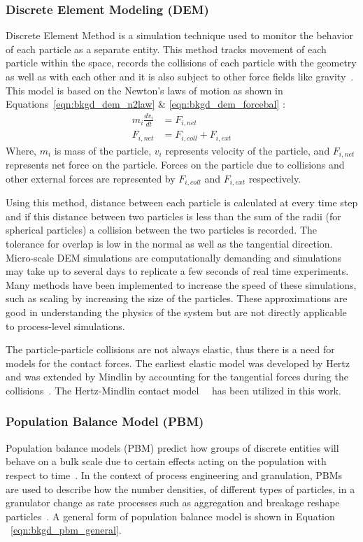 \documentclass[preprint,11pt,authoryear]{elsarticle}
\begin{document}
\subsubsection{Discrete Element Modeling (DEM)}
Discrete Element Method is a simulation technique used to monitor the
behavior of each particle as a separate entity. This method tracks 
movement of each particle within the space, records the collisions 
of each particle with the geometry as well as with each other and it 
is also subject to other force fields like  gravity~\citep{Barrasso2015cerd}. 
This model is based on the Newton's laws of motion as shown in Equations~\ref{eqn:bkgd_dem_n2law} \&
\ref{eqn:bkgd_dem_forcebal} : \\
\begin{align}
m_i\frac{dv_i}{dt} &= F_{i,net} \label{eqn:bkgd_dem_n2law} \\
F_{i,net} &=  F_{i,coll} +  F_{i,ext} \label{eqn:bkgd_dem_forcebal}
\end{align}
Where, $m_i$ is mass of the particle, $v_i$ represents velocity of the
particle, and $F_{i,net}$ represents net force on the particle. Forces on the
particle due to collisions and other external forces are represented by
$F_{i,coll}$ and $F_{i,ext}$ respectively.

Using this method, distance between each particle is calculated at every
time step and if this distance between two particles is less than the sum of
the radii (for spherical particles)  a collision between the two particles is
recorded. The tolerance for overlap is low in the normal as well as the
tangential direction. Micro-scale DEM simulations are computationally
demanding and simulations may take up to several days to replicate a few
seconds of real time experiments. Many methods have been implemented to
increase the speed of these simulations, such as scaling by increasing the
size of the particles. These approximations are good in understanding the
physics of the system but are not directly applicable to process-level
simulations.

The particle-particle collisions are not always elastic, thus there is a need
for models for the contact forces. The earliest elastic model was developed by
Hertz and was extended by Mindlin by accounting for the  tangential forces
during the collisions~\citep{adams2000}. The Hertz-Mindlin contact
model~\citep{gantt2006}~\citep{hassanpour2013} has been utilized in this work.
 

\subsubsection{Population Balance Model (PBM)}
Population balance models (PBM) predict how groups of discrete entities will 
behave on a bulk scale due to certain effects acting on the population with 
respect to time~\citep{ramkrishna2014}. In the context of process engineering 
and granulation, PBMs are used to describe how the number 
densities, of different types of particles, in a granulator change as rate 
processes such as aggregation and breakage reshape particles~\citep{Barrasso2013}. A 
general form of population balance model is shown in Equation
~\ref{eqn:bkgd_pbm_general}.
  
\end{document}
